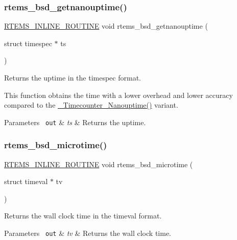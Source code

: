 \subsubsection{\texorpdfstring{rtems\_bsd\_getnanouptime()}{rtems\_bsd\_getnanouptime()}}
{\footnotesize\ttfamily \mbox{\hyperlink{group__RTEMSScoreBaseDefs_gac216239df231d5dbd15e3520b0b9313f}{R\+T\+E\+M\+S\+\_\+\+I\+N\+L\+I\+N\+E\+\_\+\+R\+O\+U\+T\+I\+NE}} void rtems\+\_\+bsd\+\_\+getnanouptime (\begin{DoxyParamCaption}\item[{struct timespec $\ast$}]{ts }\end{DoxyParamCaption})}



Returns the uptime in the timespec format. 

This function obtains the time with a lower overhead and lower accuracy compared to the \mbox{\hyperlink{group__RTEMSScoreTimecounter_ga69193b209ce281570491732c00be6cb9}{\+\_\+\+Timecounter\+\_\+\+Nanouptime()}} variant.


\begin{DoxyParams}[1]{Parameters}
\mbox{\texttt{ out}}  & {\em ts} & Returns the uptime. \\
\hline
\end{DoxyParams}
\mbox{\label{group__RTEMSAPIBSD_gabe64cdf3c2b9497f6ba1d9f1d5ce6f23}} 
\subsubsection{\texorpdfstring{rtems\_bsd\_microtime()}{rtems\_bsd\_microtime()}}
{\footnotesize\ttfamily \mbox{\hyperlink{group__RTEMSScoreBaseDefs_gac216239df231d5dbd15e3520b0b9313f}{R\+T\+E\+M\+S\+\_\+\+I\+N\+L\+I\+N\+E\+\_\+\+R\+O\+U\+T\+I\+NE}} void rtems\+\_\+bsd\+\_\+microtime (\begin{DoxyParamCaption}\item[{struct timeval $\ast$}]{tv }\end{DoxyParamCaption})}



Returns the wall clock time in the timeval format. 


\begin{DoxyParams}[1]{Parameters}
\mbox{\texttt{ out}}  & {\em tv} & Returns the wall clock time. \\
\hline
\end{DoxyParams}
\mbox{\label{group__RTEMSAPIBSD_gacc5770a94a216502f4775e7b2a404409}} 
